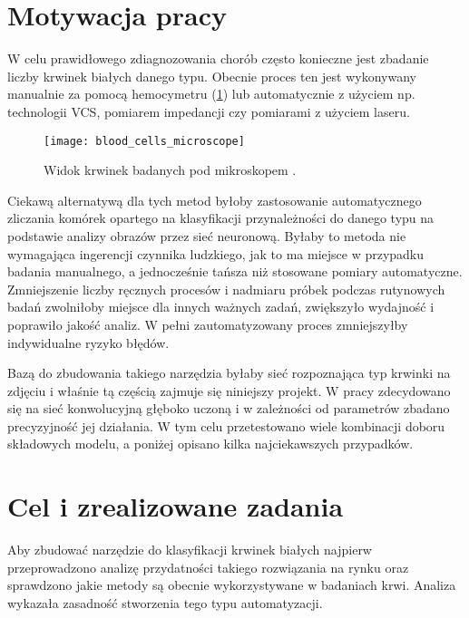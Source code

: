 \section{Motywacja pracy}
\label{sec:motywacja_pracy}

W celu prawidłowego zdiagnozowania chorób często konieczne jest zbadanie liczby krwinek białych danego typu. Obecnie proces ten jest wykonywany manualnie za pomocą hemocymetru (\ref{blood_cells_microscope}) lub automatycznie z użyciem np. technologii VCS, pomiarem impedancji czy pomiarami z użyciem laseru. 

\begin{figure}[h]
	\centering
		\texttt{[image: blood\_cells\_microscope]}
	\caption{Widok krwinek badanych pod mikroskopem \cite{cells_microscope}.}
	\label{blood_cells_microscope}
\end{figure}

{\parindent0pt %
Ciekawą alternatywą dla tych metod byłoby zastosowanie automatycznego zliczania komórek opartego na klasyfikacji przynależności do danego typu na podstawie analizy obrazów przez sieć neuronową. Byłaby to metoda nie wymagająca ingerencji czynnika ludzkiego, jak to ma miejsce w przypadku badania manualnego, a jednocześnie tańsza niż stosowane pomiary automatyczne. Zmniejszenie liczby ręcznych procesów i nadmiaru próbek podczas rutynowych badań zwolniłoby miejsce dla innych ważnych zadań, zwiększyło wydajność i poprawiło jakość analiz. W pełni zautomatyzowany proces zmniejszyłby indywidualne ryzyko błędów.

Bazą do zbudowania takiego narzędzia byłaby sieć rozpoznająca typ krwinki na zdjęciu i właśnie tą częścią zajmuje się niniejszy projekt. W pracy zdecydowano się na sieć konwolucyjną głęboko uczoną i w zależności od parametrów zbadano precyzyjność jej działania. W tym celu przetestowano wiele kombinacji doboru składowych modelu, a poniżej opisano kilka najciekawszych przypadków.
}
\section{Cel i zrealizowane zadania}
\label{sec:cel_i_zrealizowane_zadania}

Aby zbudować narzędzie do klasyfikacji krwinek białych najpierw przeprowadzono analizę przydatności takiego rozwiązania na rynku oraz sprawdzono jakie metody są obecnie wykorzystywane w badaniach krwi. Analiza wykazała zasadność stworzenia tego typu automatyzacji.

